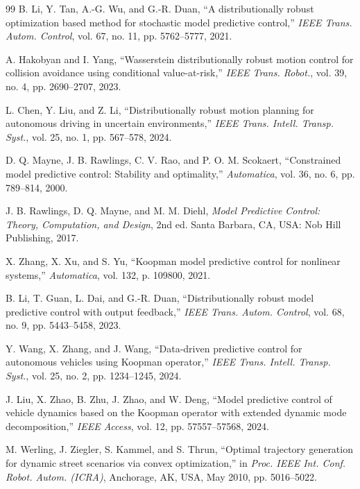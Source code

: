 \documentclass[pdflatex,sn-mathphys,Numbered]{sn-jnl}
\numberwithin{equation}{section}
\begin{document}
\begin{thebibliography}{99}
		B. Li, Y. Tan, A.-G. Wu, and G.-R. Duan,
		``A distributionally robust optimization based method for stochastic model predictive control,''
		\textit{IEEE Trans. Autom. Control}, vol. 67, no. 11, pp. 5762--5777, 2021.
		
		A. Hakobyan and I. Yang,
		``Wasserstein distributionally robust motion control for collision avoidance using conditional value-at-risk,''
		\textit{IEEE Trans. Robot.}, vol. 39, no. 4, pp. 2690--2707, 2023.
		
		L. Chen, Y. Liu, and Z. Li,
		``Distributionally robust motion planning for autonomous driving in uncertain environments,''
		\textit{IEEE Trans. Intell. Transp. Syst.}, vol. 25, no. 1, pp. 567--578, 2024.
		
		D. Q. Mayne, J. B. Rawlings, C. V. Rao, and P. O. M. Scokaert,
		``Constrained model predictive control: Stability and optimality,''
		\textit{Automatica}, vol. 36, no. 6, pp. 789--814, 2000.
		
		J. B. Rawlings, D. Q. Mayne, and M. M. Diehl,
		\textit{Model Predictive Control: Theory, Computation, and Design}, 2nd ed.
		Santa Barbara, CA, USA: Nob Hill Publishing, 2017.
		
		X. Zhang, X. Xu, and S. Yu,
		``Koopman model predictive control for nonlinear systems,''
		\textit{Automatica}, vol. 132, p. 109800, 2021.
		
		B. Li, T. Guan, L. Dai, and G.-R. Duan,
		``Distributionally robust model predictive control with output feedback,''
		\textit{IEEE Trans. Autom. Control}, vol. 68, no. 9, pp. 5443--5458, 2023.
		
		Y. Wang, X. Zhang, and J. Wang,
		``Data-driven predictive control for autonomous vehicles using Koopman operator,''
		\textit{IEEE Trans. Intell. Transp. Syst.}, vol. 25, no. 2, pp. 1234--1245, 2024.
		
		J. Liu, X. Zhao, B. Zhu, J. Zhao, and W. Deng,
		``Model predictive control of vehicle dynamics based on the Koopman operator with extended dynamic mode decomposition,''
		\textit{IEEE Access}, vol. 12, pp. 57557--57568, 2024.
		
		M. Werling, J. Ziegler, S. Kammel, and S. Thrun,
		``Optimal trajectory generation for dynamic street scenarios via convex optimization,''
		in \textit{Proc. IEEE Int. Conf. Robot. Autom. (ICRA)}, Anchorage, AK, USA, May 2010, pp. 5016--5022.
		

\end{thebibliography}
\end{document}
